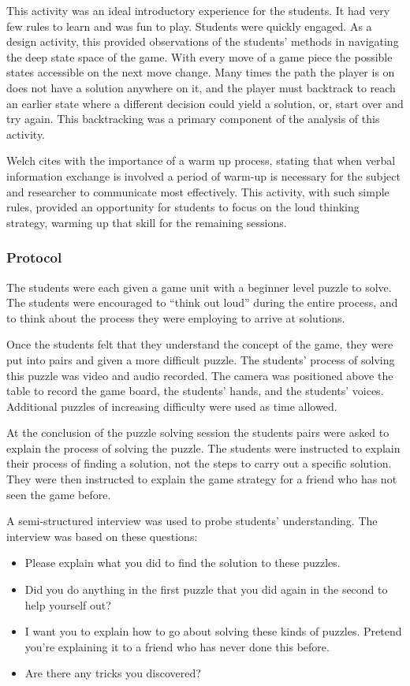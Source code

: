 	This activity was an ideal introductory experience for the students. It had very few rules to learn and was fun to play. Students were quickly engaged. As a design activity, this provided observations of the students' methods in navigating the deep state space of the game. With every move of a game piece the possible states accessible on the next move change. Many times the path the player is on does not have a solution anywhere on it, and the player must backtrack to reach an earlier state where a different decision could yield a solution, or, start over and try again. This backtracking was a primary component of the analysis of this activity.
	
	Welch cites \citet{ericsson-1984} with the importance of a warm up process, stating that when verbal information exchange is involved a period of warm-up is necessary for the subject and researcher to communicate most effectively. This activity, with such simple rules, provided an opportunity for students to focus on the loud thinking strategy, warming up that skill for the remaining sessions.
	
	\subsubsection{Protocol}
	
	The students were each given a game unit with a beginner level puzzle to solve.  The students were encouraged to {}``think out loud'' during the entire process, and to think about the process they were employing to arrive at solutions.
	
	Once the students felt that they understand the concept of the game, they were put into pairs and given a more difficult puzzle. The students\textquoteright{} process of solving this puzzle was video and audio recorded. The camera was positioned above the table to record the game board, the students\textquoteright{} hands,
	and the students\textquoteright{} voices. Additional puzzles of increasing difficulty were used as time allowed.
	
	At the conclusion of the puzzle solving session the students pairs were asked to explain the process of solving the puzzle. The students were instructed to explain their process of finding a solution, not the steps to carry out a specific solution. They were then instructed to explain the game strategy for a friend who has not seen the game before.
	
	A semi-structured interview was used to probe students\textquoteright{} understanding. The interview was based on these questions:
	\begin{itemize}
	\item Please explain what you did to find the solution to these puzzles. 
	\item Did you do anything in the first puzzle that you did again in the
	second to help yourself out? 
	\item I want you to explain how to go about solving these kinds of puzzles.
	Pretend you\textquoteright{}re explaining it to a friend who has never
	done this before. 
	\item Are there any tricks you discovered? 
	\end{itemize}
	
